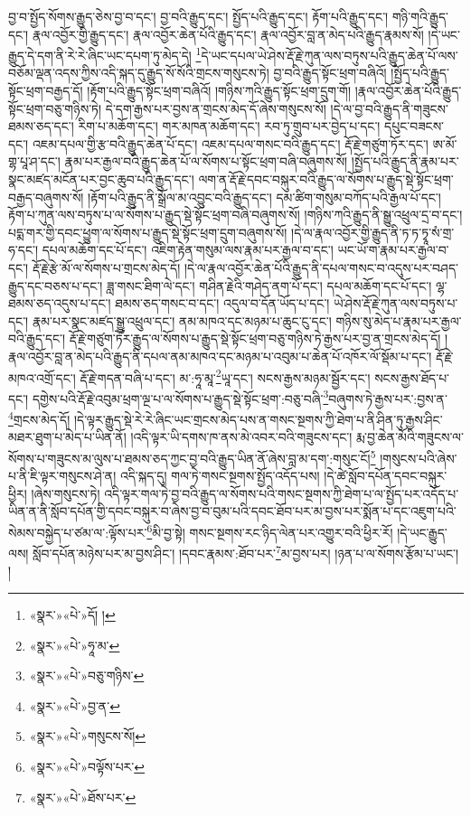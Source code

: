 བྱ་བ་སྤྱོད་སོགས་རྒྱུད་ཅེས་བྱ་བ་དང་། བྱ་བའི་རྒྱུད་དང་། སྤྱོད་པའི་རྒྱུད་དང་། རྟོག་པའི་རྒྱུད་དང་། གཉི་གའི་རྒྱུད་དང་། རྣལ་འབྱོར་གྱི་རྒྱུད་དང་། རྣལ་འབྱོར་ཆེན་པོའི་རྒྱུད་དང་། རྣལ་འབྱོར་བླ་ན་མེད་པའི་རྒྱུད་རྣམས་སོ། །དེ་ཡང་རྒྱུད་དེ་དག་ནི་རེ་རེ་ཞིང་ཡང་དཔག་ཏུ་མེད་དེ། \footnote{«སྣར་»«པེ་»དོ། ། }དེ་ཡང་དཔལ་ཡེ་ཤེས་རྡོ་རྗེ་ཀུན་ལས་བཏུས་པའི་རྒྱུད་ཆེན་པོ་ལས་བཅོམ་ལྡན་འདས་ཀྱིས་འདི་སྐད་དུ་རྒྱུད་སོ་སོའི་གྲངས་གསུངས་ཏེ། བྱ་བའི་རྒྱུད་སྟོང་ཕྲག་བཞིའོ། །སྤྱོད་པའི་རྒྱུད་སྟོང་ཕྲག་བརྒྱད་དོ། །རྟོག་པའི་རྒྱུད་སྟོང་ཕྲག་བཞིའོ། །གཉིས་ཀའི་རྒྱུད་སྟོང་ཕྲག་དྲུག་གོ། །རྣལ་འབྱོར་ཆེན་པོའི་རྒྱུད་སྟོང་ཕྲག་བཅུ་གཉིས་ཏེ། དེ་དག་རྒྱས་པར་བྱས་ན་གྲངས་མེད་དོ་ཞེས་གསུངས་སོ། །དེ་ལ་བྱ་བའི་རྒྱུད་ནི་གཟུངས་ཐམས་ཅད་དང་། རིག་པ་མཆོག་དང་། གར་མཁན་མཆོག་དང་། རབ་ཏུ་གྲུབ་པར་བྱེད་པ་དང་། དཔུང་བཟངས་དང་། འཇམ་དཔལ་གྱི་རྩ་བའི་རྒྱུད་ཆེན་པོ་དང་། འཇམ་དཔལ་གསང་བའི་རྒྱུད་དང་། རྡོ་རྗེ་གཙུག་ཏོར་དང་། ཨ་མོ་གྷ་པཱ་ཤ་དང་། རྣམ་པར་རྒྱལ་བའི་རྒྱུད་ཆེན་པོ་ལ་སོགས་པ་སྟོང་ཕྲག་བཞི་བཞུགས་སོ། །སྤྱོད་པའི་རྒྱུད་ནི་རྣམ་པར་སྣང་མཛད་མངོན་པར་བྱང་ཆུབ་པའི་རྒྱུད་དང་། ལག་ན་རྡོ་རྗེ་དབང་བསྐུར་བའི་རྒྱུད་ལ་སོགས་པ་རྒྱུད་སྡེ་སྟོང་ཕྲག་བརྒྱད་བཞུགས་སོ། །རྟོག་པའི་རྒྱུད་ནི་སྒྲོལ་མ་འབྱུང་བའི་རྒྱུད་དང་། དམ་ཚིག་གསུམ་བཀོད་པའི་རྒྱལ་པོ་དང་། རྟོག་པ་ཀུན་ལས་བཏུས་པ་ལ་སོགས་པ་རྒྱུད་སྡེ་སྟོང་ཕྲག་བཞི་བཞུགས་སོ། །གཉིས་ཀའི་རྒྱུད་ནི་སྒྱུ་འཕྲུལ་དྲ་བ་དང་། པདྨ་གར་གྱི་དབང་ཕྱུག་ལ་སོགས་པ་རྒྱུད་སྡེ་སྟོང་ཕྲག་དྲུག་བཞུགས་སོ། །དེ་ལ་རྣལ་འབྱོར་གྱི་རྒྱུད་ནི་ཏ་ཏ་ཏྭཱ་སཾ་གྲ་ཧ་དང་། དཔལ་མཆོག་དང་པོ་དང་། འཇིག་རྟེན་གསུམ་ལས་རྣམ་པར་རྒྱལ་བ་དང་། ཡང་ཡོ་ག་རྣམ་པར་རྒྱལ་བ་དང་། རྡོ་རྗེ་རྩེ་མོ་ལ་སོགས་པ་གྲངས་མེད་དོ། །དེ་ལ་རྣལ་འབྱོར་ཆེན་པོའི་རྒྱུད་ནི་དཔལ་གསང་བ་འདུས་པར་བཤད་རྒྱུད་དང་བཅས་པ་དང་། ཟླ་གསང་ཐིག་ལེ་དང་། གཤིན་རྗེའི་གཤེད་ནག་པོ་དང་། དཔལ་མཆོག་དང་པོ་དང་། ལྷ་ཐམས་ཅད་འདུས་པ་དང་། ཐམས་ཅད་གསང་བ་དང་། འདུལ་བ་དོན་ཡོད་པ་དང་། ཡེ་ཤེས་རྡོ་རྗེ་ཀུན་ལས་བཏུས་པ་དང་། རྣམ་པར་སྣང་མཛད་སྒྱུ་འཕྲུལ་དང་། ནམ་མཁའ་དང་མཉམ་པ་ཆུང་ངུ་དང་། གཉིས་སུ་མེད་པ་རྣམ་པར་རྒྱལ་བའི་རྒྱུད་དང་། རྡོ་རྗེ་གཙུག་ཏོར་རྒྱུད་ལ་སོགས་པ་རྒྱུད་སྡེ་སྟོང་ཕྲག་བཅུ་གཉིས་ཏེ་རྒྱས་པར་བྱ་ན་གྲངས་མེད་དོ། །རྣལ་འབྱོར་བླ་ན་མེད་པའི་རྒྱུད་ནི་དཔལ་ནམ་མཁའ་དང་མཉམ་པ་འབུམ་པ་ཆེན་པོ་འཁོར་ལོ་སྡོམ་པ་དང་། རྡོ་རྗེ་མཁའ་འགྲོ་དང་། རྡོ་རྗེ་གདན་བཞི་པ་དང་། མ་:ཧཱ་མཱ་\footnote{«སྣར་»«པེ་»ཧཱ་མ་}ཡཱ་དང་། སངས་རྒྱས་མཉམ་སྦྱོར་དང་། སངས་རྒྱས་ཐོད་པ་དང་། དགྱེས་པའི་རྡོ་རྗེ་འབུམ་ཕྲག་ལྔ་པ་ལ་སོགས་པ་རྒྱུད་སྡེ་སྟོང་ཕྲག་:བཅུ་བཞི་\footnote{«སྣར་»«པེ་»བཅུ་གཉིས་}བཞུགས་ཏེ་རྒྱས་པར་:བྱས་ན་\footnote{«སྣར་»«པེ་»བྱ་ན་}གྲངས་མེད་དོ། །དེ་ལྟར་རྒྱུད་སྡེ་རེ་རེ་ཞིང་ཡང་གྲངས་མེད་པས་ན་གསང་སྔགས་ཀྱི་ཐེག་པ་ནི་ཤིན་ཏུ་རྒྱས་ཤིང་མཐར་ཐུག་པ་མེད་པ་ཡིན་ནོ། །འདི་ལྟར་ཡི་དགས་ཁ་ནས་མེ་འབར་བའི་གཟུངས་དང་། རྨ་བྱ་ཆེན་མོའི་གཟུངས་ལ་སོགས་པ་གཟུངས་མ་ལུས་པ་ཐམས་ཅད་ཀྱང་བྱ་བའི་རྒྱུད་ཡིན་ནོ་ཞེས་བླ་མ་དག་:གསུང་ངོ།\footnote{«སྣར་»«པེ་»གསུངས་སོ།} །གསུངས་པའི་ཞེས་པ་ནི་ཇི་ལྟར་གསུངས་ཤེ་ན། འདི་སྐད་དུ། གལ་ཏེ་གསང་སྔགས་སྤྱོད་འདོད་པས། །དེ་ཚེ་སློབ་དཔོན་དབང་བསྐུར་ཕྱིར། །ཞེས་གསུངས་ཏེ། འདི་ལྟར་གལ་ཏེ་བྱ་བའི་རྒྱུད་ལ་སོགས་པའི་གསང་སྔགས་ཀྱི་ཐེག་པ་ལ་སྤྱོད་པར་འདོད་པ་ཡིན་ན་ནི་སློབ་དཔོན་གྱི་དབང་བསྐུར་བ་ཞེས་བྱ་བ་བུམ་པའི་དབང་ཐོབ་པར་མ་བྱས་པར་སྨོན་པ་དང་འཇུག་པའི་སེམས་བསྐྱེད་པ་ཙམ་ལ་:ལྟོས་པར་\footnote{«སྣར་»«པེ་»བལྟོས་པར་}མི་བྱ་སྟེ། གསང་སྔགས་རང་ཉིད་ལེན་པར་འགྱུར་བའི་ཕྱིར་རོ། །དེ་ཡང་རྒྱུད་ལས། སློབ་དཔོན་མཉེས་པར་མ་བྱས་ཤིང་། །དབང་རྣམས་:ཐོབ་པར་\footnote{«སྣར་»«པེ་»ཐོས་པར་}མ་བྱས་པར། །ཉན་པ་ལ་སོགས་རྩོམ་པ་ཡང་། །
